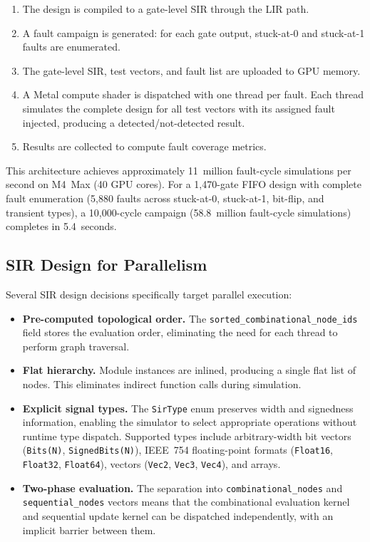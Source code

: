 \documentclass[conference]{IEEEtran}
\begin{document}
\begin{enumerate}
  \item The design is compiled to a gate-level SIR through the LIR path.
  \item A fault campaign is generated: for each gate output, stuck-at-0 and stuck-at-1 faults are enumerated.
  \item The gate-level SIR, test vectors, and fault list are uploaded to GPU memory.
  \item A Metal compute shader is dispatched with one thread per fault. Each thread simulates the complete design for all test vectors with its assigned fault injected, producing a detected/not-detected result.
  \item Results are collected to compute fault coverage metrics.
\end{enumerate}

This architecture achieves approximately 11~million fault-cycle simulations per second on M4~Max (40 GPU cores). For a 1,470-gate FIFO design with complete fault enumeration (5,880 faults across stuck-at-0, stuck-at-1, bit-flip, and transient types), a 10,000-cycle campaign (58.8~million fault-cycle simulations) completes in 5.4~seconds.

\subsection{SIR Design for Parallelism}

Several SIR design decisions specifically target parallel execution:

\begin{itemize}
  \item \textbf{Pre-computed topological order.} The \texttt{sorted\_combinational\_node\_ids} field stores the evaluation order, eliminating the need for each thread to perform graph traversal.
  \item \textbf{Flat hierarchy.} Module instances are inlined, producing a single flat list of nodes. This eliminates indirect function calls during simulation.
  \item \textbf{Explicit signal types.} The \texttt{SirType} enum preserves width and signedness information, enabling the simulator to select appropriate operations without runtime type dispatch. Supported types include arbitrary-width bit vectors (\texttt{Bits(N)}, \texttt{SignedBits(N)}), IEEE~754 floating-point formats (\texttt{Float16}, \texttt{Float32}, \texttt{Float64}), vectors (\texttt{Vec2}, \texttt{Vec3}, \texttt{Vec4}), and arrays.
  \item \textbf{Two-phase evaluation.} The separation into \texttt{combinational\_nodes} and \texttt{sequential\_nodes} vectors means that the combinational evaluation kernel and sequential update kernel can be dispatched independently, with an implicit barrier between them.
\end{itemize}
\end{document}
